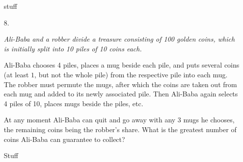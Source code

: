 \documentclass{article}
\begin{document}
\begin{enumerate}
stuff


\medskip
\item[8.] %
{\itshape Ali-Baba and a robber divide a treasure consisting of 100 golden coins, which is initially split into 10 piles of 10 coins each.

Ali-Baba chooses 4 piles, places a mug beside each pile, and puts several coins (at least $1$, but not the whole pile) from the respective pile into each mug.
The robber must permute the mugs, after which the coins are taken out from each mug and added to its newly associated pile.
Then Ali-Baba again selects 4 piles of 10, places mugs beside the piles, etc.

At any moment Ali-Baba can quit and go away with any 3 mugs he chooses, the remaining coins being the robber's share.
What is the greatest number of coins Ali-Baba can guarantee to collect?}

Stuff


\end{enumerate}
\end{document}
